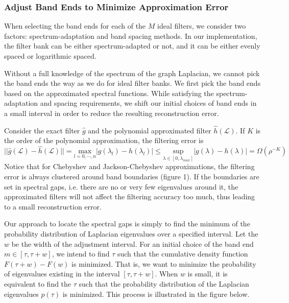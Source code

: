 \documentclass[a4paper]{article}
\newcommand{\La}{\mathcal{L}}
\theoremstyle{definition}
\begin{document}
\subsubsection{Adjust Band Ends to Minimize Approximation Error}
When selecting the band ends for each of the $M$ ideal filters, we consider two factors: spectrum-adaptation and band spacing methods. In our implementation, the filter bank can be either spectrum-adapted or not, and it can be either evenly spaced or logarithmic spaced.

Without a full knowledge of the spectrum of the graph Laplacian, we cannot pick the band ends the way as we do for ideal filter banks. We first pick the band ends based on the approximated spectral functions. While satisfying the spectrum-adaptation and spacing requirements, we shift our initial choices of band ends in a small interval in order to reduce the resulting reconstruction error.

Consider the exact filter $\hat{g}$ and the polynomial approximated filter $\hat{h}(\La)$. If $K$ is the order of the polynomial approximation, the filtering error is 
$$||\hat{g}(\La) - \hat{h}(\La)|| = \underset{l = 0,\cdots,n}{\text{max}} |g(\lambda_l) - h(\lambda_l)| \leq \underset{\lambda \in [0, \lambda_{max}]}{ \text{sup}} |g(\lambda) - h(\lambda)| = \Omega(\rho^{-K})$$
Notice that for Chebyshev and Jackson-Chebyshev approximations, the filtering error is always clustered around band boundaries (figure 1). If the boundaries are set in spectral gaps, i.e. there are no or very few eigenvalues around it, the approximated filters will not affect the filtering accuracy too much, thus leading to a small reconstruction error.  

Our approach to locate the spectral gaps is simply to find the minimum of the probability distribution of Laplacian eigenvalues over a specified interval. Let the $w$ be the width of the adjustment interval. For an initial choice of the band end $m \in [\tau, \tau+w]$, we intend to find $\tau$ such that the cumulative density function $F(\tau+w)-F(w)$ is minimized. That is, we want to minimize the probability of eigenvalues existing in the interval $[\tau, \tau+w]$. When $w$ is small, it is equivalent to find the $\tau$ such that the probability distribution of the Laplacian eigenvalues $p(\tau)$ is minimized. This process is illustrated in the figure below.
\end{document}

